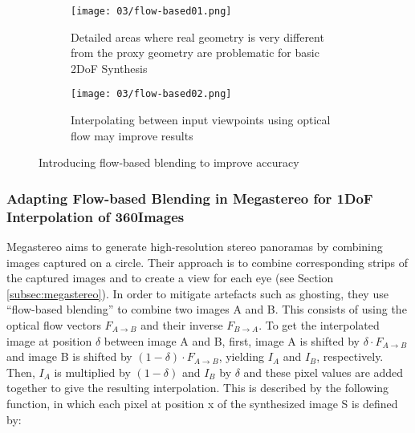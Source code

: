 \begin{figure}
\centering
    \hfill
    \begin{subfigure}[t]{0.4\textwidth}            
            \centering
            \texttt{[image: 03/flow-based01.png]}
            \caption{Detailed areas where real geometry is very different from the proxy geometry are problematic for basic 2DoF Synthesis}
    \end{subfigure}%
    \hfill
    \begin{subfigure}[t]{0.4\textwidth}
            \centering
            \texttt{[image: 03/flow-based02.png]}
            \caption{Interpolating between input viewpoints using optical flow may improve results}
    \end{subfigure}
    \hfill
    \hfill
  \caption[Flow-based blending to improve accuracy in close, detailed areas]{Introducing flow-based blending to improve accuracy} \label{fig:flow-based-mot}
\end{figure}


\subsubsection{Adapting Flow-based Blending in Megastereo for 1DoF Interpolation of 360\degree Images}
Megastereo \cite{megastereo} aims to generate high-resolution stereo panoramas by combining images captured on a circle. Their approach is to combine corresponding strips of the captured images and to create a view for each eye (see Section \ref{subsec:megastereo}). In order to mitigate artefacts such as ghosting, they use ``flow-based blending'' to combine two images A and B. This consists of using the optical flow vectors $F_{A\rightarrow B}$ and their inverse $F_{B\rightarrow A}$. To get the interpolated image at position $\delta$ between image A and B, first, image A is shifted by $\delta \cdot F_{A\to B}$ and image B is shifted by $(1 - \delta) \cdot F_{A\to B}$, yielding $I_A$ and $I_B$, respectively. Then, $I_A$ is multiplied by $(1-\delta)$ and $I_B$ by $\delta$ and these pixel values are added together to give the resulting interpolation. This is described by the following function, in which each pixel at position x of the synthesized image S is defined by: 

